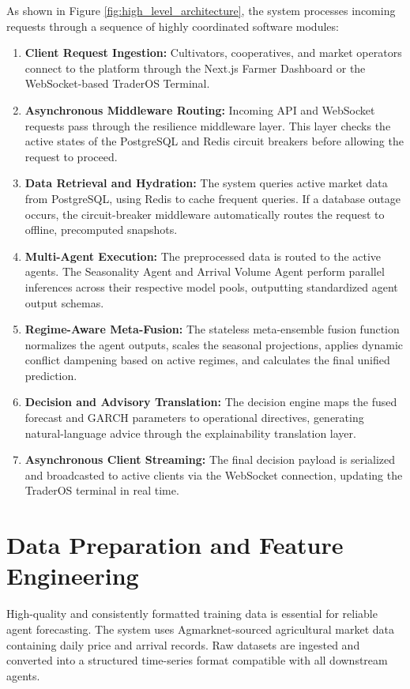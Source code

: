 \documentclass[12pt,a4paper]{report}
\theoremstyle{definition}
\theoremstyle{remark}
\begin{document}
\noindent As shown in Figure \ref{fig:high_level_architecture}, the system processes incoming requests through a sequence of highly coordinated software modules:
\begin{enumerate}
    \item \textbf{Client Request Ingestion:} Cultivators, cooperatives, and market operators connect to the platform through the Next.js Farmer Dashboard or the WebSocket-based TraderOS Terminal.
    \item \textbf{Asynchronous Middleware Routing:} Incoming API and WebSocket requests pass through the resilience middleware layer. This layer checks the active states of the PostgreSQL and Redis circuit breakers before allowing the request to proceed.
    \item \textbf{Data Retrieval and Hydration:} The system queries active market data from PostgreSQL, using Redis to cache frequent queries. If a database outage occurs, the circuit-breaker middleware automatically routes the request to offline, precomputed snapshots.
    \item \textbf{Multi-Agent Execution:} The preprocessed data is routed to the active agents. The Seasonality Agent and Arrival Volume Agent perform parallel inferences across their respective model pools, outputting standardized agent output schemas.
    \item \textbf{Regime-Aware Meta-Fusion:} The stateless meta-ensemble fusion function normalizes the agent outputs, scales the seasonal projections, applies dynamic conflict dampening based on active regimes, and calculates the final unified prediction.
    \item \textbf{Decision and Advisory Translation:} The decision engine maps the fused forecast and GARCH parameters to operational directives, generating natural-language advice through the explainability translation layer.
    \item \textbf{Asynchronous Client Streaming:} The final decision payload is serialized and broadcasted to active clients via the WebSocket connection, updating the TraderOS terminal in real time.
\end{enumerate}

\section{Data Preparation and Feature Engineering}

High-quality and consistently formatted training data is essential for reliable agent forecasting. The system uses Agmarknet-sourced agricultural market data containing daily price and arrival records. Raw datasets are ingested and converted into a structured time-series format compatible with all downstream agents.
\end{document}
